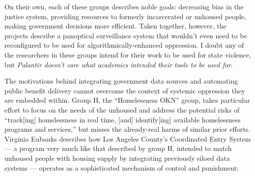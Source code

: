 On their own, each of these groups describes noble goals: decreasing
bias in the justice system, providing resources to formerly incarcerated
or unhoused people, making government decisions more efficient. Taken
together, however, the projects describe a panoptical surveillance
system that wouldn't even need to be reconfigured to be used for
algorithmically-enhanced oppression. I doubt any of the researchers in
these groups intend for their work to be used for state violence, but
\emph{Palantir doesn't care what academics intended their tools to be
used for}.

The motivations behind integrating government data sources and
automating public benefit delivery cannot overcome the context of
systemic oppression they are embedded within. Group H, the
``Homelessness OKN'' group, takes particular effort to focus on the needs of the unhoused and address
the potential risks of ``track{[}ing{]} homelessness in real time,
{[}and{]} identify{[}ing{]} available homelessness programs and
services,'' but misses the already-real harms of similar prior efforts.
Virginia Eubanks describes how Los Angeles County's Coordinated Entry
System --- a program very much like that described by group H, intended
to match unhoused people with housing supply by integrating previously
siloed data systems --- operates as a sophisticated mechanism of control
and punishment:


